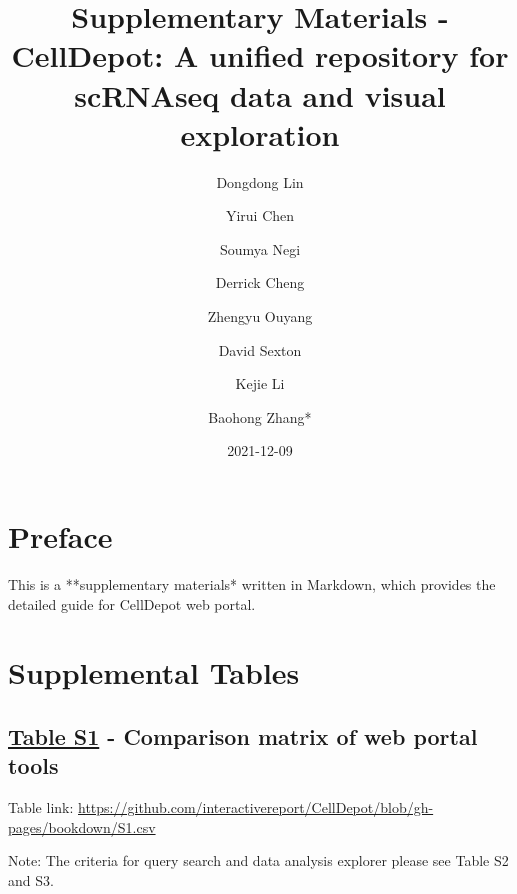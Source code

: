 \documentclass[
  openany]{book}
\title{Supplementary Materials - CellDepot: A unified repository for scRNAseq data and visual exploration}
\author{Dongdong Lin \and Yirui Chen \and Soumya Negi \and Derrick Cheng \and Zhengyu Ouyang \and David Sexton \and Kejie Li \and Baohong Zhang*}
\date{2021-12-09}
\begin{document}
\maketitle

{
\setcounter{tocdepth}{1}
\tableofcontents
}
\hypertarget{preface}{%
\chapter{Preface}\label{preface}}

This is a **supplementary materials* written in Markdown, which provides the detailed guide for CellDepot web portal.

\hypertarget{SITable}{%
\chapter{Supplemental Tables}\label{SITable}}

\hypertarget{table-s1---comparison-matrix-of-web-portal-tools}{%
\section*{\texorpdfstring{\href{https://github.com/interactivereport/CellDepot/blob/gh-pages/bookdown/S1.csv}{Table S1} - Comparison matrix of web portal tools}{Table S1 - Comparison matrix of web portal tools}}\label{table-s1---comparison-matrix-of-web-portal-tools}}
Table link: \url{https://github.com/interactivereport/CellDepot/blob/gh-pages/bookdown/S1.csv}

Note: The criteria for query search and data analysis explorer please see Table S2 and S3.
\end{document}
